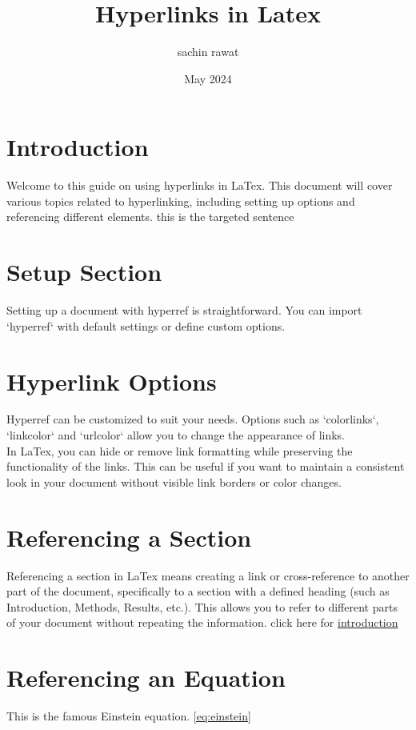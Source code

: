 \documentclass{article}
\title{Hyperlinks in Latex}
\author{sachin rawat}
\date{May 2024}
\begin{document}
\maketitle
\tableofcontents

\section{Introduction}
\label{sec:intro}
Welcome to this guide on using hyperlinks in LaTex. This document will cover various topics related to hyperlinking, including setting up options and referencing different elements. \hypertarget{label}{this is the targeted sentence}

\section{Setup Section}
\label{sec:setup}
Setting up a document with hyperref is straightforward. You can import `hyperref` with default settings or define custom options.

\section{Hyperlink Options}
\label{sec:options}
Hyperref can be customized to suit your needs. Options such as `colorlinks`, `linkcolor` and `urlcolor` allow you to change the appearance of links.\\

In LaTex, you can hide or remove link formatting while preserving the functionality of the links. This can be useful if you want to maintain a consistent look in your document without visible link borders or color changes.

\section{Referencing a Section}
\label{sec:section}
Referencing a section in LaTex means creating a link or cross-reference to another part of the document, specifically to a section with a defined heading (such as Introduction, Methods, Results, etc.). This allows you to refer to different parts of your document without repeating the information. click here for \hyperref[sec:intro]{introduction}

\section{Referencing an Equation}
\label{sec:equation}
This is the famous Einstein equation. \ref{eq:einstein} 
\end{document}
